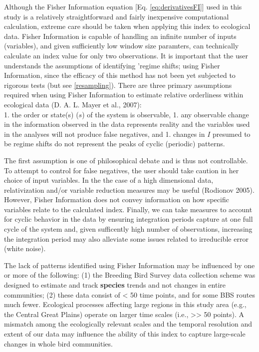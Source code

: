 \documentclass[12pt,twoside,openany]{reedthesis}
\begin{document}
Although the Fisher Information equation {[}Eq.
\eqref{eq:derivativesFI}{]} used in this study is a relatively
straightforward and fairly inexpensive computational calculation,
extreme care should be taken when applying this index to ecological
data. Fisher Information is capable of handling an infinite number of
inputs (variables), and given sufficiently low window size paramters,
can technically calculate an index value for only two observations. It
is important that the user understands the assumptions of identifying
'regime shifts; using Fisher Information, since the efficacy of this
method has not been yet subjected to rigorous tests (but see
\ref{resampling}). There are three primary assumptions required when
using Fisher Information to estimate relative orderliness within
ecological data (D. A. L. Mayer et al., 2007):\\
1. the order or state(s) (\(s\)) of the system is observable, 1. any
observable change in the information observed in the data represents
reality and the variables used in the analyses will not produce false
negatives, and 1. changes in \(I\) presumed to be regime shifts do not
represent the peaks of cyclic (periodic) patterns.

The first assumption is one of philosophical debate and is thus not
controllable. To attempt to control for false negatives, the user should
take caution in her choice of input variables. In the the case of a high
dimensional data, relativization and/or variable reduction measures may
be useful (Rodionov 2005). However, Fisher Information does not convey
information on how specific variables relate to the calculated index.
Finally, we can take measures to account for cyclic behavior in the data
by ensuring integration periods capture at one full cycle of the system
and, given sufficently high number of observations, increasing the
integration period may also alleviate some issues related to irreducible
error (white noise).

The lack of patterns identified using Fisher Information may be
influenced by one or more of the following: (1) the Breeding Bird Survey
data collection scheme was designed to estimate and track
\textbf{species} trends and not changes in entire communities; (2) these
data consist of \textless{} 50 time points, and for some BBS routes much
fewer. Ecological processes affecting large regions in this study area
(e.g., the Central Great Plains) operate on larger time scales (i.e.,
\textgreater{}\textgreater{} 50 points). A mismatch among the
ecologically relevant scales and the temporal resolution and extent of
our data may influence the ability of this index to capture large-scale
changes in whole bird communities.
\end{document}
